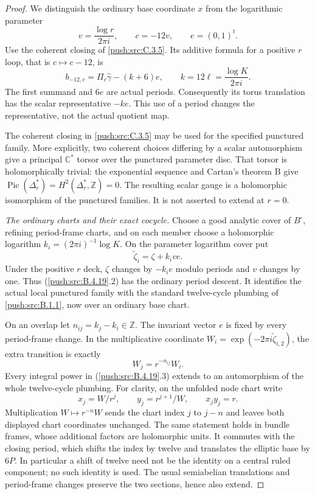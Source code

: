 \begin{proof}
We distinguish the ordinary base coordinate $x$ from
the logarithmic parameter
\[
 v=\frac{\log r}{2\pi i},\qquad c=-12v,
 \qquad e=(0,1)^t.
\]
Use the coherent closing of \ref{push:src:C.3.5}. Its additive formula
for a positive $r$ loop, that is $c\mapsto c-12$, is
\[
 b_{-12,c}=\Pi_c\widehat\gamma-(k+6)e,
 \qquad k=12\ell=\frac{\log K}{2\pi i}.
 \tag{B.4.19.1}
\]
The first summand and $6e$ are actual periods.
Consequently its torus translation has the scalar
representative $-ke$. This use of a period changes
the representative, not the actual quotient map.

The coherent closing in \ref{push:src:C.3.5} may be used for the
specified punctured family. More explicitly, two
coherent choices differing by a scalar automorphism
give a principal $\mathbb C^*$ torsor over the punctured
parameter disc. That torsor is holomorphically trivial:
the exponential sequence and Cartan's theorem B give
$\operatorname{Pic}(\Delta_r^*)=H^2(\Delta_r^*,\mathbb Z)=0$.
The resulting scalar gauge is a holomorphic
isomorphism of the punctured families. It is not
asserted to extend at $r=0$.

\emph{The ordinary charts and their exact cocycle.}
Choose a good analytic cover of $B^\circ$, refining
period-frame charts, and on each member choose a
holomorphic logarithm $k_i=(2\pi i)^{-1}\log K$.
On the parameter logarithm cover put
\[
 \widetilde\zeta_i=\zeta+k_i v e.
 \tag{B.4.19.2}
\]
Under the positive $r$ deck, $\zeta$ changes by
$-k_i e$ modulo periods and $v$ changes by one.
Thus (\ref{push:src:B.4.19}.2) has the ordinary period descent.
It identifies the actual local punctured family
with the standard twelve-cycle plumbing of \ref{push:src:B.1.1},
now over an ordinary base chart.

On an overlap let $n_{ij}=k_j-k_i\in\mathbb Z$.
The invariant vector $e$ is fixed by every period-frame
change. In the multiplicative coordinate
$W_i=\exp(-2\pi i\widetilde\zeta_{i,2})$, the extra
transition is exactly
\[
 W_j=r^{-n_{ij}}W_i.
 \tag{B.4.19.3}
\]
Every integral power in (\ref{push:src:B.4.19}.3) extends to an
automorphism of the whole twelve-cycle plumbing.
For clarity, on the unfolded node chart write
\[
 x_j=W/r^j,\qquad y_j=r^{j+1}/W,
 \qquad x_jy_j=r.
\]
Multiplication $W\mapsto r^{-n}W$ sends the chart
index $j$ to $j-n$ and leaves both displayed chart
coordinates unchanged. The same statement holds
in bundle frames, whose additional factors are
holomorphic units. It commutes with the closing
period, which shifts the index by twelve and
translates the elliptic base by $6P$. In particular
a shift of twelve need not be the identity on a
central ruled component; no such identity is used.
The usual semiabelian translations and period-frame
changes preserve the two sections, hence also extend.


\end{proof}
